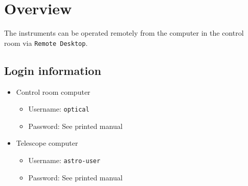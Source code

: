 \documentclass[a4paper, 11pt, fleqn]{memoir}
\begin{document}
\section{Overview}
The instruments can be operated remotely from the computer in the control room via \texttt{Remote Desktop}.

\subsection{Login information}
\begin{itemize}
    \item
          Control room computer
          \begin{itemize}
              \item
                    Username: \texttt{optical}
              \item
                    Password: See printed manual
          \end{itemize}
    \item
          Telescope computer
          \begin{itemize}
              \item
                    Username: \texttt{astro-user}
              \item
                    Password: See printed manual
          \end{itemize}
\end{itemize}
\end{document}
